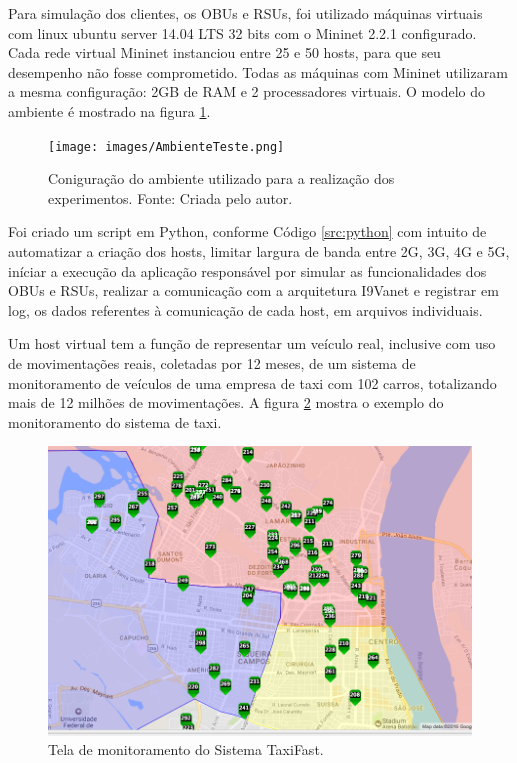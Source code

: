 \documentclass[
	12pt,				%
	oneside,			%
	a4paper,			%
	english,			%
	brazil				%
	]{abntex2ppgsi}
\begin{document}

Para simulação dos clientes, os OBUs e RSUs, foi utilizado máquinas virtuais com linux ubuntu server 14.04 LTS 32 bits com o Mininet 2.2.1 configurado. Cada rede virtual Mininet instanciou entre 25 e 50 hosts, para que seu desempenho não fosse comprometido. Todas as máquinas com Mininet  utilizaram a mesma configuração:  2GB de RAM e 2 processadores virtuais. O modelo do ambiente é mostrado na figura \ref{fig:cenarioConsiderado}.


\begin{figure}[t!]
	\centering
	\texttt{[image: images/AmbienteTeste.png]}
	\caption{Coniguração do ambiente utilizado para a realização dos experimentos. Fonte: Criada pelo autor.}
	\label{fig:cenarioConsiderado}
\end{figure}

Foi criado um script em Python, conforme Código \ref{src:python} com intuito de automatizar a criação dos hosts, limitar largura de banda entre 2G, 3G, 4G e 5G, iníciar a execução da aplicação responsável por simular as funcionalidades dos OBUs e RSUs,  realizar a comunicação com a arquitetura I9Vanet e registrar em log, os dados referentes à comunicação de cada host, em arquivos individuais.

Um host virtual tem a função de representar um veículo real, inclusive com uso de movimentações reais, coletadas por 12 meses, de um sistema de monitoramento de veículos de uma empresa de taxi com 102 carros, totalizando mais de 12 milhões de movimentações. A figura \ref{fig:monitoramento} mostra o exemplo do monitoramento do sistema de taxi.

\begin{figure}[t!]
	\centering
	\includegraphics[width=1.0\columnwidth]{images/taxi_mapa.png}
	\caption{Tela de monitoramento do Sistema TaxiFast.}
	\label{fig:monitoramento}
\end{figure}
\end{document}
